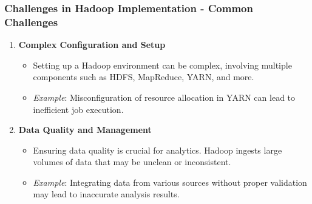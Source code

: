 \documentclass[aspectratio=169]{beamer}
\begin{document}
\begin{frame}[fragile]
    \frametitle{Challenges in Hadoop Implementation - Common Challenges}
    \begin{enumerate}
        \item \textbf{Complex Configuration and Setup}
        \begin{itemize}
            \item Setting up a Hadoop environment can be complex, involving multiple components such as HDFS, MapReduce, YARN, and more.
            \item \textit{Example}: Misconfiguration of resource allocation in YARN can lead to inefficient job execution.
        \end{itemize}

        \item \textbf{Data Quality and Management}
        \begin{itemize}
            \item Ensuring data quality is crucial for analytics. Hadoop ingests large volumes of data that may be unclean or inconsistent.
            \item \textit{Example}: Integrating data from various sources without proper validation may lead to inaccurate analysis results.
        \end{itemize}
    \end{enumerate}
\end{frame}
\end{document}
